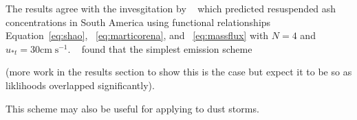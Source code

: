 \conclusions  %

The results agree with the invesgitation by ~\cite{Folch14} which predicted resuspended ash concentrations in South America using functional
relationships Equation~\ref{eq:shao}, ~\ref{eq:marticorena}, and ~\ref{eq:massflux} with $N=4$ and $u_{*t}=30\mathrm{cm}\;\mathrm{s}^{-1}$.
~\cite{Folch14} found that the simplest emission scheme 


(more work in the results section to show this is the case but expect it to be so as liklihoods overlapped significantly).

This scheme may also be useful for applying to dust storms.




